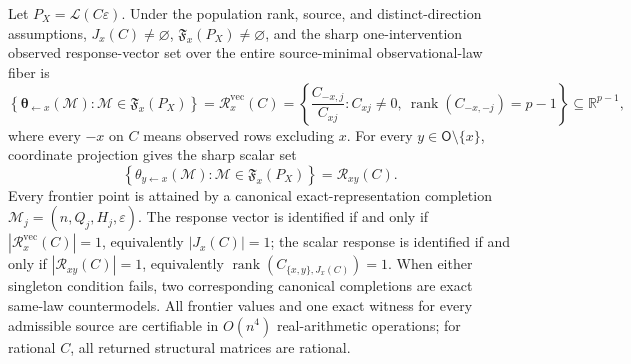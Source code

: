 Let \(P_X=\mathcal L(C\varepsilon)\). Under the population rank, source, and distinct-direction assumptions, \(J_x(C)\ne\varnothing\), \(\mathfrak F_x(P_X)\ne\varnothing\), and the sharp one-intervention observed response-vector set over the entire source-minimal observational-law fiber is
\[
\left\{\boldsymbol\theta_{\leftarrow x}(\mathcal M):\mathcal M\in\mathfrak F_x(P_X)\right\}
=\mathcal R_x^{\mathrm{vec}}(C)
=\left\{\frac{C_{-x,j}}{C_{xj}}:C_{xj}\ne0,\ \operatorname{rank}(C_{-x,-j})=p-1\right\}\subseteq\mathbb R^{p-1},
\]
where every \(-x\) on \(C\) means observed rows excluding \(x\). For every \(y\in\mathsf O\setminus\{x\}\), coordinate projection gives the sharp scalar set
\[
\left\{\theta_{y\leftarrow x}(\mathcal M):\mathcal M\in\mathfrak F_x(P_X)\right\}
=\mathcal R_{xy}(C).
\]
Every frontier point is attained by a canonical exact-representation completion \(\mathcal M_j=(n,Q_j,H_j,\varepsilon)\). The response vector is identified if and only if \(|\mathcal R_x^{\mathrm{vec}}(C)|=1\), equivalently \(|J_x(C)|=1\); the scalar response is identified if and only if \(|\mathcal R_{xy}(C)|=1\), equivalently \(\operatorname{rank}(C_{\{x,y\},J_x(C)})=1\). When either singleton condition fails, two corresponding canonical completions are exact same-law countermodels. All frontier values and one exact witness for every admissible source are certifiable in \(O(n^4)\) real-arithmetic operations; for rational \(C\), all returned structural matrices are rational.